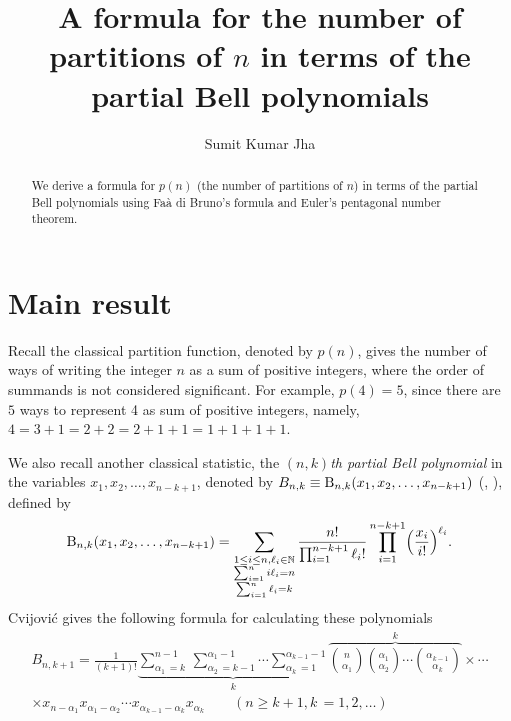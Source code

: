 \documentclass{amsart}
\author{Sumit Kumar Jha}
\theoremstyle{plain}
\theoremstyle{definition}
\newcommand{\bell}{\textup{B}}
\begin{document}
	
\title[A formula for the number of partitions of $n$]
 {A formula for the number of partitions of $n$ in terms of the partial Bell polynomials}


\begin{abstract}
We derive a formula for $p(n)$ (the number of partitions of $n$) in terms of the partial Bell polynomials using Fa\`{a} di Bruno's formula and Euler's pentagonal number theorem.
\end{abstract}

\maketitle

\section{Main result}
Recall the classical partition function, denoted by $p(n)$, gives the number of ways of writing the integer $n$ as a sum of positive integers, where the order of summands is not considered significant. For example, $p(4)=5$, since there are $5$ ways to represent 4 as
sum of positive integers, namely, $4= 3+1=2+2=2+1+1=1+1+1+1$.\par 
We also recall another classical statistic, the {\it $(n,k)$th partial Bell polynomial} in the variables $x_{1},x_{2},\dotsc,x_{n-k+1}$, denoted by $B_{n,k}\equiv\bell_{n,k}(x_1,x_2,\dotsc,x_{n-k+1})$ (\cite[p. 134]{Comtet}, \cite[Ch. 12]{Andrews}), defined by
\begin{equation*}
\bell_{n,k}(x_1,x_2,\dotsc,x_{n-k+1})=\sum_{\substack{1\le i\le n,\ell_i\in\mathbb{N}\\ \sum_{i=1}^ni\ell_i=n\\ \sum_{i=1}^n\ell_i=k}}\frac{n!}{\prod_{i=1}^{n-k+1}\ell_i!} \prod_{i=1}^{n-k+1}\Bigl(\frac{x_i}{i!}\Bigr)^{\ell_i}.
\end{equation*}
Cvijovi\'{c} \cite{Bell} gives the following formula for calculating these polynomials
\begin{eqnarray}
\label{explicitio}
 B_{n, k + 1}  =   \frac{1}{(k+1)!} \underbrace{\sum_{\alpha_1\,=  k}^{n-1} \, \sum_{\alpha_2\,=  k-1}^{\alpha_1-1} \cdots  \sum_{\alpha_k\, = 1}^{\alpha_{k-1}-1} }_{k }
\overbrace{\binom{n}{\alpha_1}  \binom{\alpha_1}{\alpha_2} \cdots  \binom{\alpha_{k-1}}{\alpha_k}}^{k}\nonumber \times \cdots \\
\times x_{n-\alpha_1} x_{\alpha_1 -\alpha_2} \cdots x_{\alpha_{k-1}-\alpha_k} x_{\alpha_k} \qquad(n\geq k+1, k\,=1, 2, \ldots)
\end{eqnarray}
\end{document}
